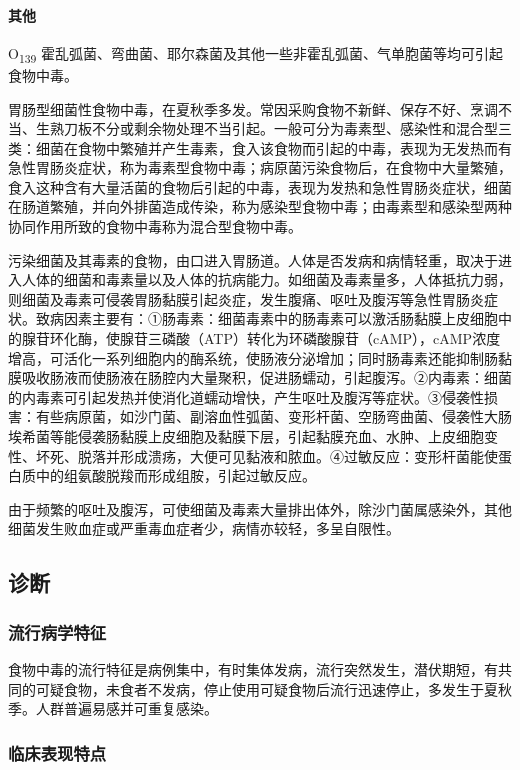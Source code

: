 \paragraph{其他}

O\textsubscript{139}
霍乱弧菌、弯曲菌、耶尔森菌及其他一些非霍乱弧菌、气单胞菌等均可引起食物中毒。

胃肠型细菌性食物中毒，在夏秋季多发。常因采购食物不新鲜、保存不好、烹调不当、生熟刀板不分或剩余物处理不当引起。一般可分为毒素型、感染性和混合型三类：细菌在食物中繁殖并产生毒素，食入该食物而引起的中毒，表现为无发热而有急性胃肠炎症状，称为毒素型食物中毒；病原菌污染食物后，在食物中大量繁殖，食入这种含有大量活菌的食物后引起的中毒，表现为发热和急性胃肠炎症状，细菌在肠道繁殖，并向外排菌造成传染，称为感染型食物中毒；由毒素型和感染型两种协同作用所致的食物中毒称为混合型食物中毒。

污染细菌及其毒素的食物，由口进入胃肠道。人体是否发病和病情轻重，取决于进入人体的细菌和毒素量以及人体的抗病能力。如细菌及毒素量多，人体抵抗力弱，则细菌及毒素可侵袭胃肠黏膜引起炎症，发生腹痛、呕吐及腹泻等急性胃肠炎症状。致病因素主要有：①肠毒素：细菌毒素中的肠毒素可以激活肠黏膜上皮细胞中的腺苷环化酶，使腺苷三磷酸（ATP）转化为环磷酸腺苷（cAMP），cAMP浓度增高，可活化一系列细胞内的酶系统，使肠液分泌增加；同时肠毒素还能抑制肠黏膜吸收肠液而使肠液在肠腔内大量聚积，促进肠蠕动，引起腹泻。②内毒素：细菌的内毒素可引起发热并使消化道蠕动增快，产生呕吐及腹泻等症状。③侵袭性损害：有些病原菌，如沙门菌、副溶血性弧菌、变形杆菌、空肠弯曲菌、侵袭性大肠埃希菌等能侵袭肠黏膜上皮细胞及黏膜下层，引起黏膜充血、水肿、上皮细胞变性、坏死、脱落并形成溃疡，大便可见黏液和脓血。④过敏反应：变形杆菌能使蛋白质中的组氨酸脱羧而形成组胺，引起过敏反应。

由于频繁的呕吐及腹泻，可使细菌及毒素大量排出体外，除沙门菌属感染外，其他细菌发生败血症或严重毒血症者少，病情亦较轻，多呈自限性。

\subsection{诊断}

\subsubsection{流行病学特征}

食物中毒的流行特征是病例集中，有时集体发病，流行突然发生，潜伏期短，有共同的可疑食物，未食者不发病，停止使用可疑食物后流行迅速停止，多发生于夏秋季。人群普遍易感并可重复感染。

\subsubsection{临床表现特点}

